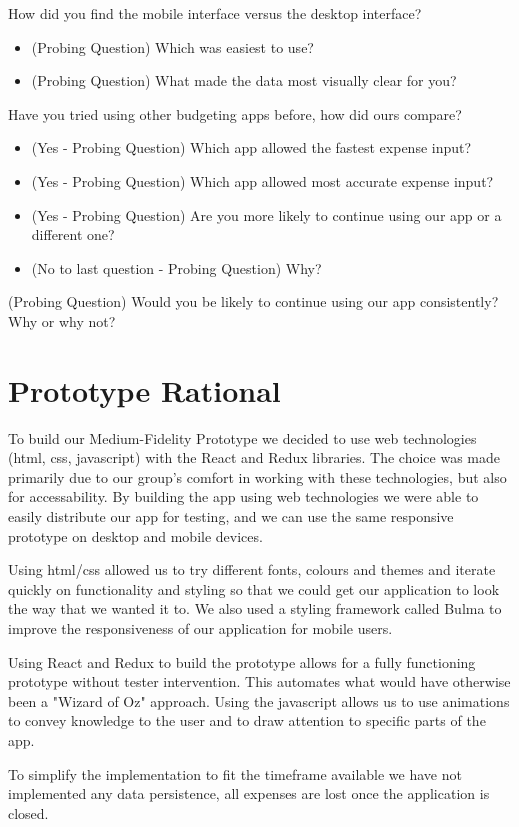 \documentclass{chi2011}
\begin{document}
	How did you find the mobile interface versus the desktop interface?
	\begin{itemize}
		\item (Probing Question) Which was easiest to use?
        \item (Probing Question) What made the data most visually clear for you?
	\end{itemize}
		
	Have you tried using other budgeting apps before, how did ours compare?
	\begin{itemize}
        \item (Yes - Probing Question) Which app allowed the fastest expense input?
        \item (Yes - Probing Question) Which app allowed most accurate expense input?
        \item (Yes - Probing Question) Are you more likely to continue using our app or a different one?
    \item (No to last question - Probing Question) Why?
	\end{itemize}
    (Probing Question) Would you be likely to continue using our app consistently? Why or why not?

	\section{Prototype Rational}

    To build our Medium-Fidelity Prototype we decided to use web technologies
    (html, css, javascript) with the React and Redux libraries. The choice was made primarily
    due to our group's comfort in working with these technologies, but also for accessability.
    By building the app using web technologies we were able to easily distribute our app for testing,
    and we can use the same responsive prototype on desktop and mobile devices.

    Using html/css allowed us to try different fonts, colours and themes
    and iterate quickly on functionality and styling so that we could get our
    application to look the way that we wanted it to. We also used a styling framework
    called Bulma to improve the responsiveness of our application for mobile users.

    Using React and Redux to build the prototype allows for a fully functioning prototype
    without tester intervention. This automates what would have otherwise been a "Wizard of Oz"
    approach. Using the javascript allows us to use animations to convey knowledge to the user
    and to draw attention to specific parts of the app.

    To simplify the implementation to fit the timeframe available we have not implemented any 
    data persistence, all expenses are lost once the application is closed.



\end{document}
